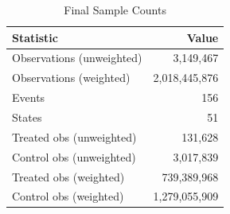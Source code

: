 \begin{table}[!h]
\centering
\caption{Final Sample Counts}
\centering
\fontsize{10}{12}\selectfont
\begin{tabular}[t]{lr}
\toprule
Statistic & Value\\
\midrule
Observations (unweighted) & 3,149,467\\
Observations (weighted) & 2,018,445,876\\
Events & 156\\
States & 51\\
Treated obs (unweighted) & 131,628\\
\addlinespace
Control obs (unweighted) & 3,017,839\\
Treated obs (weighted) & 739,389,968\\
Control obs (weighted) & 1,279,055,909\\
\bottomrule
\end{tabular}
\end{table}
